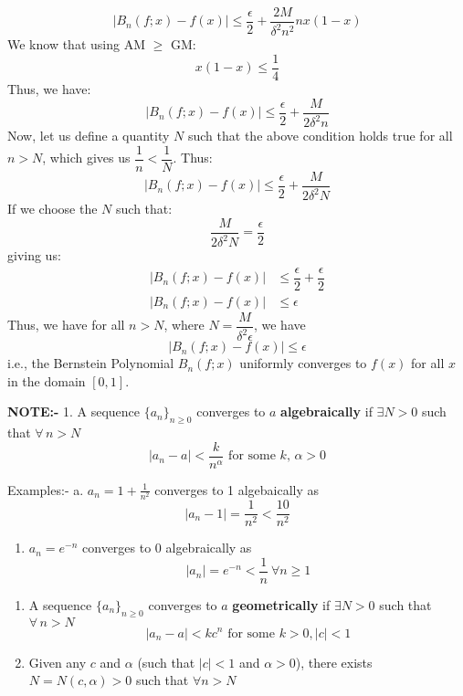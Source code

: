 \documentclass[
]{book}
\providecommand{\tightlist}{%
  \setlength{\itemsep}{0pt}\setlength{\parskip}{0pt}}
\begin{document}
\begin{equation*}
    |B_n(f;x) - f(x)| \leq \frac{\epsilon}{2} + \dfrac{2M}{\delta^2 n^2} nx(1-x)
\end{equation*}
We know that using AM \(\geq\) GM:
\begin{equation*}
    x(1-x) \leq \dfrac{1}{4}
\end{equation*}
Thus, we have:
\begin{equation*}
    |B_n(f;x) - f(x)| \leq \frac{\epsilon}{2} + \dfrac{M}{2\delta^2 n}
\end{equation*}
Now, let us define a quantity \(N\) such that the above condition holds true for all \(n > N\), which gives us \(\dfrac{1}{n} < \dfrac{1}{N}\). Thus:
\begin{equation*}
    |B_n(f;x) - f(x)| \leq \frac{\epsilon}{2} + \dfrac{M}{2\delta^2 N}
\end{equation*}
If we choose the \(N\) such that:
\begin{equation*}
    \dfrac{M}{2\delta^2N} = \dfrac{\epsilon}{2}
\end{equation*}
giving us:
\begin{align*}
    |B_n(f;x) - f(x)| &\leq \dfrac{\epsilon}{2} + \dfrac{\epsilon}{2} \\
    |B_n(f;x) - f(x)| &\leq \epsilon
\end{align*}
Thus, we have for all \(n > N\), where \(N = \dfrac{M}{\delta^2\epsilon}\), we have
\begin{equation}
    |B_n(f;x) - f(x)| \leq \epsilon
\end{equation}
i.e., the Bernstein Polynomial \(B_n(f;x)\) uniformly converges to \(f(x)\) for all \(x\) in the domain \([0,1]\).

\textbf{NOTE:-}
1. A sequence \(\{a_n\}_{n \ge 0}\) converges to \(a\) \textbf{algebraically} if \(\exists N>0\) such that \(\forall \, n>N\)
\[|a_n-a|<\frac{k}{n^{\alpha}} \text{ for some } k, \,\alpha >0 \]

Examples:- a. \(a_n = 1+\frac{1}{n^2}\) converges to 1 algebaically as \[|a_n-1| = \frac{1}{n^2}<\frac{10}{n^2}\]

\begin{enumerate}
\def\labelenumi{\alph{enumi}.}
\setcounter{enumi}{1}
\tightlist
\item
  \(a_n = e^{-n}\) converges to 0 algebraically as \[|a_n| =e^{-n} <\frac{1}{n} \ \forall n\ge 1\]
\end{enumerate}

\begin{enumerate}
\def\labelenumi{\arabic{enumi}.}
\setcounter{enumi}{1}
\item
  A sequence \(\{a_n\}_{n \ge 0}\) converges to \(a\) \textbf{geometrically} if \(\exists N>0\) such that \(\forall \, n>N\)
  \[|a_n-a|<kc^n \text{ for some } k>0 , |c|<1 \]
\item
  Given any \(c\) and \(\alpha\) (such that \(|c|<1\) and \(\alpha>0\)), there exists \(N = N(c,\alpha)>0\) such that \(\forall n>N\)
\end{enumerate}
\end{document}
